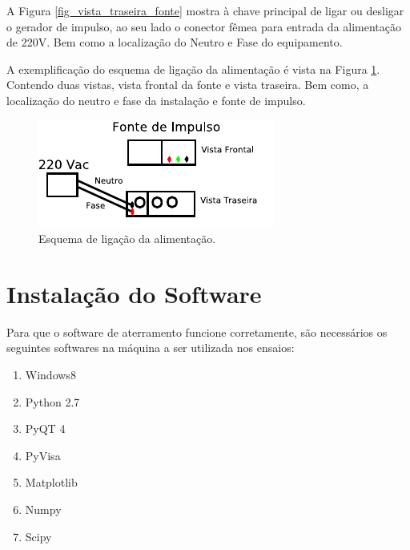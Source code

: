\documentclass[a4paper, 10pt]{article}
\begin{document}
A Figura \ref{fig_vista_traseira_fonte} mostra à chave principal de ligar ou 
desligar o gerador de impulso, ao seu lado o conector fêmea para entrada da alimentação de 220V.
Bem como a localização do Neutro e Fase do equipamento. 


A exemplificação do esquema de ligação da alimentação é vista 
na Figura \ref{fig_esquema_ligacao_alimentacao}. Contendo duas vistas, vista frontal da fonte e vista
traseira. Bem como, a localização do neutro e fase da instalação e fonte de impulso.

\begin{figure}[!h]
        \caption{\label{fig_esquema_ligacao_alimentacao} Esquema de ligação da alimentação.}
	    \begin{center}
            \includegraphics[scale=1.2]{../fotos/conexoes/alimentacao.pdf}
	    \end{center}
\end{figure}




\section{Instalação do Software}

Para que o software de aterramento funcione corretamente, 
são necessários os seguintes softwares na máquina a ser utilizada nos ensaios:

\begin{enumerate}
    \item Windows8
    \item Python 2.7
    \item PyQT 4
    \item PyVisa
    \item Matplotlib
    \item Numpy
    \item Scipy
\end{enumerate}
\end{document}
